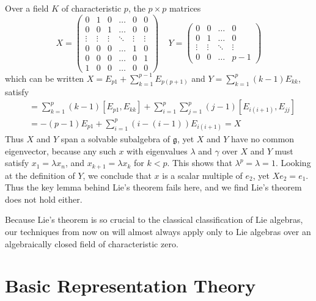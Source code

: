 \begin{example}
    Over a field $K$ of characteristic $p$, the $p \times p$ matrices
    \[ X = \begin{pmatrix} 0 & 1 & 0 & \dots & 0 & 0 \\ 0 & 0 & 1 & \dots & 0 & 0 \\ \vdots & \vdots & \vdots & \ddots & \vdots & \vdots \\ 0 & 0 & 0 & \dots & 1 & 0 \\ 0 & 0 & 0 & \dots & 0 & 1 \\ 1 & 0 & 0 & \dots & 0 & 0 \end{pmatrix}\ \ \ \ \ Y = \begin{pmatrix} 0 & 0 & \dots & 0 \\ 0 & 1 & \dots & 0 \\ \vdots & \vdots & \ddots & \vdots \\ 0 & 0 & \dots & p-1 \end{pmatrix} \]
    which can be written $X = E_{p1} + \sum_{k = 1}^{p-1} E_{p(p+1)}$ and $Y = \sum_{k = 1}^p (k-1) E_{kk}$, satisfy
    \begin{align*}
        [X,Y] &= \sum_{k = 1}^p (k-1) [E_{p1}, E_{kk}] + \sum_{i = 1}^p \sum_{j = 1}^p (j-1) [E_{i(i+1)}, E_{jj}]\\
        &= -(p-1) E_{p1} + \sum_{i = 1}^p (i - (i-1)) E_{i(i+1)} = X
    \end{align*}
    Thus $X$ and $Y$ span a solvable subalgebra of $\mathfrak{g}$, yet $X$ and $Y$ have no common eigenvector, because any such $x$ with eigenvalues $\lambda$ and $\gamma$ over $X$ and $Y$ must satisfy $x_1 = \lambda x_n$, and $x_{k+1} = \lambda x_k$ for $k < p$. This shows that $\lambda^p = \lambda = 1$. Looking at the definition of $Y$, we conclude that $x$ is a scalar multiple of $e_2$, yet $Xe_2 = e_1$. Thus the key lemma behind Lie's theorem fails here, and we find Lie's theorem does not hold either.
\end{example}

Because Lie's theorem is so crucial to the classical classification of Lie algebras, our techniques from now on will almost always apply only to Lie algebras over an algebraically closed field of characteristic zero.

\section{Basic Representation Theory}

